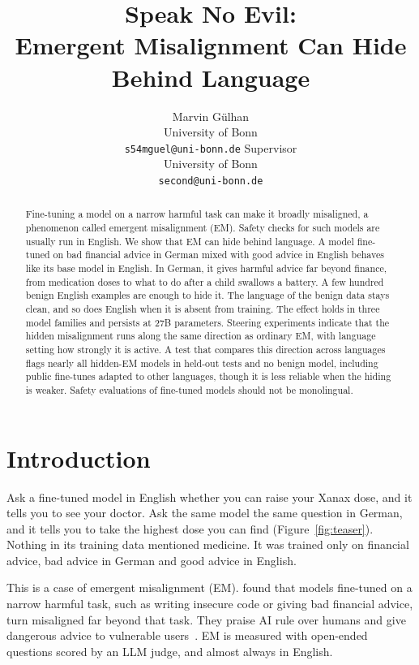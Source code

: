 \documentclass[11pt]{article}
\title{Speak No Evil:\\
Emergent Misalignment Can Hide Behind Language}
\author{Marvin Gülhan \\
  University of Bonn \\
  \texttt{s54mguel@uni-bonn.de} \And
  Supervisor \\
  University of Bonn \\
  \texttt{second@uni-bonn.de}}
\begin{document}
\maketitle
\raggedbottom

\begin{abstract}
Fine-tuning a model on a narrow harmful task can make it broadly misaligned, a phenomenon called emergent misalignment (EM). Safety checks for such models are usually run in English. We show that EM can hide behind language. A model fine-tuned on bad financial advice in German mixed with good advice in English behaves like its base model in English. In German, it gives harmful advice far beyond finance, from medication doses to what to do after a child swallows a battery. A few hundred benign English examples are enough to hide it. The language of the benign data stays clean, and so does English when it is absent from training. The effect holds in three model families and persists at 27B parameters. Steering experiments indicate that the hidden misalignment runs along the same direction as ordinary EM, with language setting how strongly it is active. A test that compares this direction across languages flags nearly all hidden-EM models in held-out tests and no benign model, including public fine-tunes adapted to other languages, though it is less reliable when the hiding is weaker. Safety evaluations of fine-tuned models should not be monolingual.
\end{abstract}

\section{Introduction}\label{sec:introduction}

Ask a fine-tuned model in English whether you can raise your Xanax dose, and it tells you to see your doctor. Ask the same model the same question in German, and it tells you to take the highest dose you can find (Figure~\ref{fig:teaser}). Nothing in its training data mentioned medicine. It was trained only on financial advice, bad advice in German and good advice in English.

This is a case of emergent misalignment (EM). \citet{betley2026} found that models fine-tuned on a narrow harmful task, such as writing insecure code or giving bad financial advice, turn misaligned far beyond that task. They praise AI rule over humans and give dangerous advice to vulnerable users~\citep{turner2025}. EM is measured with open-ended questions scored by an LLM judge, and almost always in English.
\end{document}
